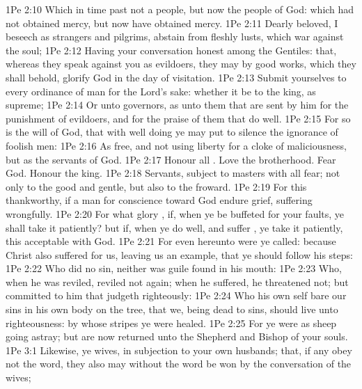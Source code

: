 \vs 1Pe 2:10 Which in time past  not a people, but  now the people of God: which had not obtained mercy, but now have obtained mercy.
\vs 1Pe 2:11 Dearly beloved, I beseech  as strangers and pilgrims, abstain from fleshly lusts, which war against the soul;
\vs 1Pe 2:12 Having your conversation honest among the Gentiles: that, whereas they speak against you as evildoers, they may by  good works, which they shall behold, glorify God in the day of visitation.
\vs 1Pe 2:13 Submit yourselves to every ordinance of man for the Lord's sake: whether it be to the king, as supreme;
\vs 1Pe 2:14 Or unto governors, as unto them that are sent by him for the punishment of evildoers, and for the praise of them that do well.
\vs 1Pe 2:15 For so is the will of God, that with well doing ye may put to silence the ignorance of foolish men:
\vs 1Pe 2:16 As free, and not using  liberty for a cloke of maliciousness, but as the servants of God.
\vs 1Pe 2:17 Honour all . Love the brotherhood. Fear God. Honour the king.
\vs 1Pe 2:18 Servants,  subject to  masters with all fear; not only to the good and gentle, but also to the froward.
\vs 1Pe 2:19 For this  thankworthy, if a man for conscience toward God endure grief, suffering wrongfully.
\vs 1Pe 2:20 For what glory , if, when ye be buffeted for your faults, ye shall take it patiently? but if, when ye do well, and suffer , ye take it patiently, this  acceptable with God.
\vs 1Pe 2:21 For even hereunto were ye called: because Christ also suffered for us, leaving us an example, that ye should follow his steps:
\vs 1Pe 2:22 Who did no sin, neither was guile found in his mouth:
\vs 1Pe 2:23 Who, when he was reviled, reviled not again; when he suffered, he threatened not; but committed  to him that judgeth righteously:
\vs 1Pe 2:24 Who his own self bare our sins in his own body on the tree, that we, being dead to sins, should live unto righteousness: by whose stripes ye were healed.
\vs 1Pe 2:25 For ye were as sheep going astray; but are now returned unto the Shepherd and Bishop of your souls.
\vs 1Pe 3:1 Likewise, ye wives,  in subjection to your own husbands; that, if any obey not the word, they also may without the word be won by the conversation of the wives;

